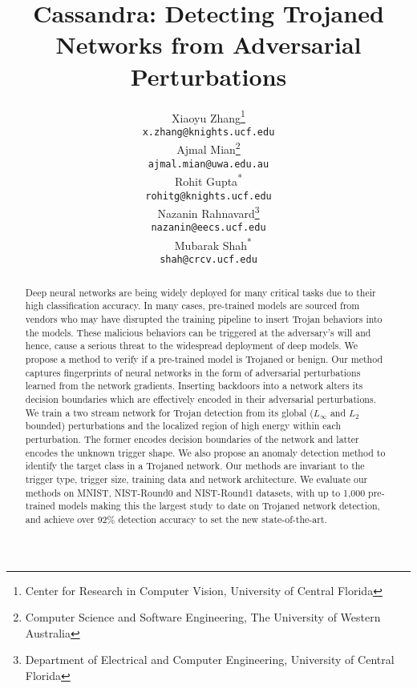 \documentclass{article}
\title{Cassandra: Detecting Trojaned Networks from Adversarial Perturbations}
\author{
    Xiaoyu Zhang\thanks{Center for Research in Computer Vision, University of Central Florida} \\
    \texttt{x.zhang@knights.ucf.edu} \\
    \And
    Ajmal Mian\thanks{Computer Science and Software Engineering, The University of Western Australia} \\
    \texttt{ajmal.mian@uwa.edu.au} \\
    \And
    Rohit Gupta\textsuperscript{*} \\
    \texttt{rohitg@knights.ucf.edu} \\
    \And
    Nazanin Rahnavard\thanks{Department of Electrical and Computer Engineering, University of Central Florida} \\
    \texttt{nazanin@eecs.ucf.edu} \\\
    \And
    Mubarak Shah\textsuperscript{*} \\
    \texttt{shah@crcv.ucf.edu} \\
}
\begin{document}
\maketitle

\begin{abstract}





\vspace{-3mm}
Deep neural networks are being widely deployed for many critical tasks due to their high classification accuracy. In many cases, pre-trained models are sourced from vendors who may have disrupted the training pipeline to insert Trojan behaviors into the models. These malicious behaviors can be triggered at the adversary's will and hence, cause a serious threat to the widespread deployment of deep models. We propose a method to verify if a pre-trained model is Trojaned or benign. Our method captures fingerprints of neural networks in the form of adversarial perturbations learned from the network gradients. Inserting backdoors into a network alters its decision boundaries which are effectively encoded in their adversarial perturbations. We train a two stream network for Trojan detection from its global ($L_\infty$ and $L_2$ bounded) perturbations and the localized region of high energy within each perturbation. The former encodes decision boundaries of the network and latter encodes the unknown trigger shape. We also propose an anomaly detection method to identify the target class in a Trojaned network. Our methods are invariant to the trigger type, trigger size, training data and network architecture. We evaluate our methods on MNIST, NIST-Round0 and NIST-Round1 datasets, with up to 1,000 pre-trained models making this the largest study to date on Trojaned network detection, and achieve over 92\% detection accuracy to set the new state-of-the-art.
\end{abstract}





\vspace{-5mm}
\end{document}
